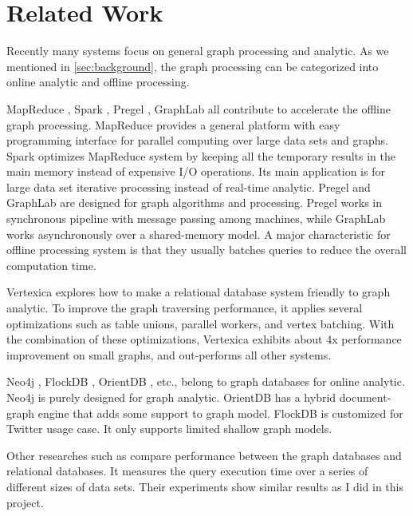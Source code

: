 \documentclass[letterpaper,twocolumn,11pt]{article}
\begin{document}
{%

\section{Related Work}
Recently many systems focus on general graph processing and analytic. As we mentioned in \autoref{sec:background}, the graph processing can be categorized into online analytic and offline processing.

MapReduce \cite{dean2008mapreduce}, Spark \cite{zaharia2012resilient}, Pregel \cite{malewicz2010pregel}, GraphLab \cite{low2012distributed} all contribute to accelerate the offline graph processing. MapReduce provides a general platform with easy programming interface for parallel computing over large data sets and graphs. Spark optimizes MapReduce system by keeping all the temporary results in the main memory instead of expensive I/O operations. Its main application is for large data set iterative processing instead of real-time analytic. Pregel and GraphLab are designed for graph algorithms and processing. Pregel works in synchronous pipeline with message passing among machines, while GraphLab works asynchronously over a shared-memory model. A major characteristic for offline processing system is that they usually batches queries to reduce the overall computation time.

Vertexica \cite{jindal2014vertexica} explores how to make a relational database system friendly to graph analytic. To improve the graph traversing performance, it applies several optimizations such as table unions, parallel workers, and vertex batching. With the combination of these optimizations, Vertexica exhibits about 4x performance improvement on small graphs, and out-performs all other systems. 

Neo4j \cite{neo4j}, FlockDB \cite{flockdb}, OrientDB \cite{orientdb}, etc., belong to graph databases for online analytic. Neo4j is purely designed for graph analytic. OrientDB has a hybrid document-graph engine that adds some support to graph model. FlockDB is customized for Twitter usage case. It only supports limited shallow graph models.

Other researches such as \cite{vicknair2010comparison} compare performance between the graph databases and relational databases. It measures the query execution time over a series of different sizes of data sets. Their experiments show similar results as I did in this project.

}
\end{document}
